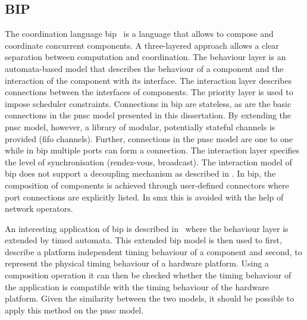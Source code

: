 \subsection{BIP}
\label{sect_related_coord_bip}
The coordination language \gls{bip}~\cite{basu2006, bliudze2008} is a language that allows to compose and coordinate concurrent components.
A three-layered approach allows a clear separation between computation and coordination.
The behaviour layer is an automata-based model that describes the behaviour of a component and the interaction of the component with its interface.
The interaction layer describes connections between the interfaces of components.
The priority layer is used to impose scheduler constraints.
Connections in \gls{bip} are stateless, as are the basic connections in the \gls{pnsc} model presented in this dissertation.
By extending the \gls{pnsc} model, however, a library of modular, potentially stateful channels is provided (\eg \gls{fifo} channels).
Further, connections in the \gls{pnsc} model are one to one while in \gls{bip} multiple ports can form a connection.
The interaction layer specifies the level of synchronisation (\eg rendez-vous, broadcast).
The interaction model of \gls{bip} does not support a decoupling mechanism as described in \Sect{\ref{sect_cci_decoupling_sync}}.
In \gls{bip}, the composition of components is achieved through user-defined connectors where port connections are explicitly listed.
In \gls*{smx} this is avoided with the help of network operators.

An interesting application of \gls{bip} is described in~\cite{abdellatif2010} where the behaviour layer is extended by timed automata.
This extended \gls{bip} model is then used to first, describe a platform independent timing behaviour of a component and second, to represent the physical timing behaviour of a hardware platform.
Using a composition operation it can then be checked whether the timing behaviour of the application is compatible with the timing behaviour of the hardware platform.
Given the similarity between the two models, it should be possible to apply this method on the \gls{pnsc} model.


